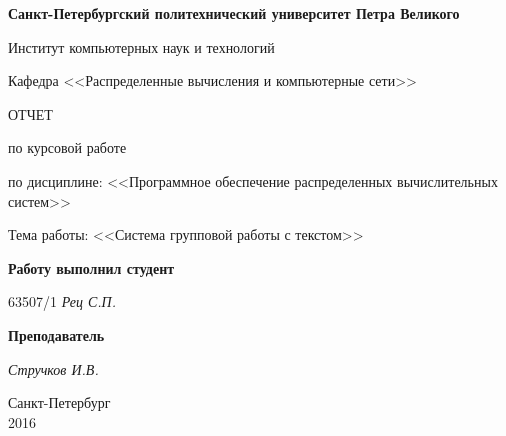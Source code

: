 \begin{titlepage}
\begin{center}

\textbf{Санкт-Петербургский политехнический университет Петра Великого}

\vspace{5mm}
Институт компьютерных наук и технологий

\vspace{5mm}
Кафедра <<Распределенные вычисления и компьютерные сети>>

\vspace*{\fill}

\huge{ОТЧЕТ}

\Large{по курсовой работе}

\large{по дисциплине: <<Программное обеспечение распределенных вычислительных систем>>}

\vspace*{2mm}
\large{Тема работы: <<Система групповой работы с текстом>>}

\vspace*{\fill}
\end{center}

\begin{large}
\hspace{0.4\linewidth} \textbf{Работу выполнил студент}

\vspace{5mm}
\hspace{0.4\linewidth} 63507/1 \hspace{1cm} \textit{Рец С.П.}

\vspace{3mm}
\hspace{0.4\linewidth} \textbf{Преподаватель}

\vspace{5mm}
\hspace{0.4\linewidth} \underline{\hspace{2cm} } \hspace{3mm} \textit{Стручков И.В.}
\end{large}

\vspace*{3cm}

\begin{center}
\normalsize Санкт-Петербург\\2016
\end{center}
\end{titlepage}